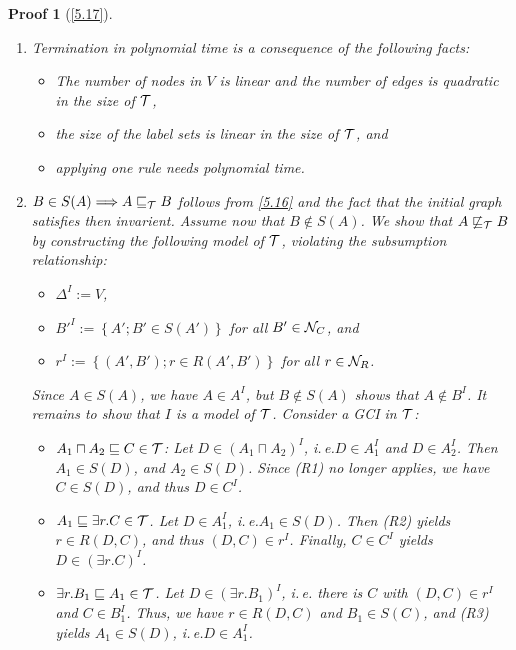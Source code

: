 \documentclass[openany]{scrbook}
\theoremstyle{break}
\theoremstyle{nonumberbreak}
\theoremstyle{nonumberplain}
\theoremstyle{nonumberbreak}
\newtheorem{Proof}{Proof}
\newcommand{\then}{\Longrightarrow}
\newcommand{\set}[1]{\left\{#1\right\}}
\newcommand{\ie}{i{.}\,e{.}\xspace}
\begin{document}
\begin{Proof}[\cref{5.17}]
  \begin{enumerate}
  \item Termination in polynomial time is a consequence of the
    following facts:
    \begin{itemize}
    \item The number of nodes in $V$ is linear and the number of edges
      is quadratic in the size of ${\cal T}$,
    \item the size of the label sets is linear in the size of ${\cal
        T}$, and
    \item applying one rule needs polynomial time.
    \end{itemize}
  \item $B \in S(A) \then A \sqsubseteq_{\cal T} B$ follows from
    \cref{5.16} and the fact that the initial graph satisfies then
    invarient. Assume now that $B \not\in S(A)$. We show that $A
    \not\sqsubseteq_{\cal T} B$ by constructing the following model of
    ${\cal T}$, violating the subsumption relationship:
    \begin{itemize}
    \item $\Delta^I := V$,
    \item ${B'}^I := \set{A'; B' \in S(A')}$ for all $B' \in {\cal
        N}_C$, and
    \item $r^I := \set{(A', B'); r \in R(A', B')}$ for all $r \in
      {\cal N}_R$.
    \end{itemize}
    Since $A \in S(A)$, we have $A \in A^I$, but $B \not\in S(A)$
    shows that $A \not\in B^I$. It remains to show that $I$ is a model
    of ${\cal T}$. Consider a GCI in ${\cal T}$:
    \begin{itemize}
    \item $A_1 \sqcap A_2 \sqsubseteq C \in {\cal T}$:
      Let $D \in (A_1 \sqcap A_2)^I$, \ie $D \in A_1^I$ and $D \in
      A_2^I$. Then $A_1 \in S(D)$, and $A_2 \in S(D)$. Since (R1) no
      longer applies, we have $C \in S(D)$, and thus $D \in C^I$.
    \item $A_1 \sqsubseteq \exists r.C \in {\cal T}$. Let $D \in
      A_1^I$, \ie $A_1 \in S(D)$. Then (R2) yields $r \in R(D, C)$,
      and thus $(D, C) \in r^I$. Finally, $C \in C^I$ yields $D \in
      (\exists r.C)^I$.
    \item $\exists r. B_1 \sqsubseteq A_1 \in {\cal T}$. Let $D \in
      (\exists r. B_1)^I$, \ie there is $C$ with $(D, C) \in r^I$ and
      $C \in B_1^I$. Thus, we have $r \in R(D, C)$ and $B_1 \in
      S(C)$, and (R3) yields $A_1 \in S(D)$, \ie $D \in A_1^I$.
    \end{itemize}
  \end{enumerate}
\end{Proof}
\end{document}
